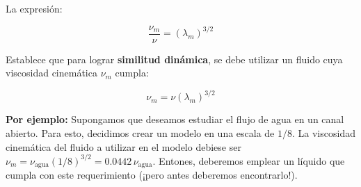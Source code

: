 \documentclass[t]{beamer}
\begin{document}
\begin{frame}

La expresi\'on:

$$\frac{\nu_m}{\nu} = \left( \lambda_m\right)^{3/2}$$

Establece que para lograr \textbf{similitud din\'amica}, se debe utilizar un fluido cuya viscosidad cinem\'atica $\nu_m$ cumpla:

$$\nu_m = \nu \left( \lambda_m\right)^{3/2}$$

\textbf{\color{red}{Lo cual puede ser muy dif\'icil (o imposible!).}} 

\vspace{0.2cm}

\textbf{Por ejemplo:} Supongamos que deseamos estudiar el flujo de agua en un canal abierto. Para esto, decidimos crear un modelo en una escala de $1/8$. La viscosidad cinemática del fluido a utilizar en el modelo debiese ser $\nu_m = \nu_{\text{agua}}\left(1/8\right)^{3/2} = 0.0442\, \nu_{\text{agua}}$. Entones, deberemos emplear un líquido que cumpla con este requerimiento (¡pero antes deberemos encontrarlo!).
\end{frame}
\end{document}
